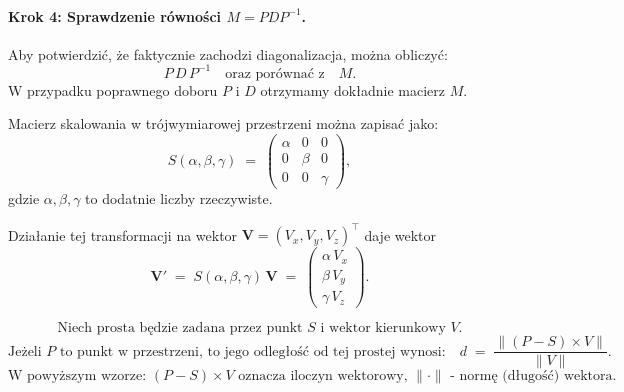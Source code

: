 \paragraph{Krok 4: Sprawdzenie równości \(M = P D P^{-1}\).}
Aby potwierdzić, że faktycznie zachodzi diagonalizacja, można obliczyć:
\[
P\,D\,P^{-1}
\quad\text{oraz porównać z}\quad
M.
\]
W przypadku poprawnego doboru \(P\) i \(D\) otrzymamy dokładnie macierz \(M\).





\vspace{1em}
\noindent
Macierz skalowania w trójwymiarowej przestrzeni można zapisać jako:
\[
S(\alpha,\beta,\gamma) 
\;=\;
\begin{pmatrix}
\alpha & 0      & 0 \\
0      & \beta  & 0 \\
0      & 0      & \gamma
\end{pmatrix},
\]
gdzie \(\alpha,\beta,\gamma\) to dodatnie liczby rzeczywiste.

\bigskip
\noindent
Działanie tej transformacji na wektor \(\mathbf{V} = (V_x, V_y, V_z)^\top\) daje wektor
\[
\mathbf{V}' \;=\; S(\alpha,\beta,\gamma)\,\mathbf{V}
\;=\;
\begin{pmatrix}
\alpha\,V_x \\
\beta\,V_y \\
\gamma\,V_z
\end{pmatrix}.
\]


\[
\text{Niech prosta będzie zadana przez punkt } S \text{ i wektor kierunkowy } V.
\]
\[
\text{Jeżeli } P \text{ to punkt w przestrzeni, to jego odległość od tej prostej wynosi:}
\quad
d \;=\; \frac{\|(P - S)\times V\|}{\|V\|}.
\]
\[
\text{W powyższym wzorze: }
(P-S)\times V \text{ oznacza iloczyn wektorowy, }
\|\cdot\|\text{ - normę (długość) wektora.}
\]


